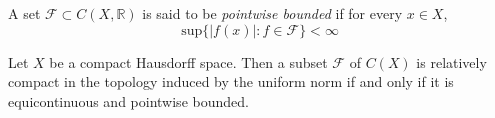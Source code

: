 \begin{definition}
\label{definition-pointwise-bounded}
A set $\mathcal{F}\subset C(X,\mathbb{R})$ is said to be {\it pointwise
bounded} if for every $x \in X$,
$$
\text{sup}\{|f(x)|:f \in \mathcal{F}\}<\infty
$$
\end{definition}

\begin{theorem}
\label{theorem-Arzela-Ascoli}
Let $X$ be a compact Hausdorff space. Then a subset $\mathcal{F}$ of $C(X)$ is
relatively compact in the topology induced by the uniform norm if and only if it
is equicontinuous and pointwise bounded.
\end{theorem}






